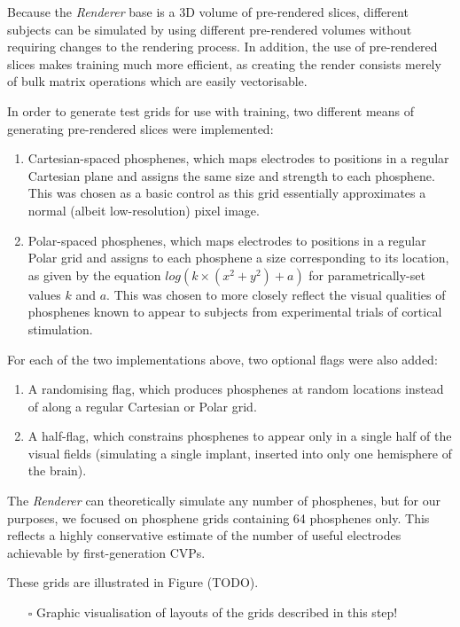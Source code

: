 \documentclass[a4paper,11pt,openany]{book}
\begin{document}
Because the \emph{Renderer} base is a 3D volume of pre-rendered slices, different subjects can be simulated by using different pre-rendered volumes without requiring changes to the rendering process.
In addition, the use of pre-rendered slices makes training much more efficient, as creating the render consists merely of bulk matrix operations which are easily vectorisable.

In order to generate test grids for use with training, two different means of generating pre-rendered slices were implemented:
\begin{enumerate}
\item Cartesian-spaced phosphenes, which maps electrodes to positions in a regular Cartesian plane and assigns the same size and strength to each phosphene.
This was chosen as a basic control as this grid essentially approximates a normal (albeit low-resolution) pixel image.
\item Polar-spaced phosphenes, which maps electrodes to positions in a regular Polar grid and assigns to each phosphene a size corresponding to its location, as given by the equation \(log(k \times (x^2 + y^2) + a)\) for parametrically-set values \(k\) and \(a\).
This was chosen to more closely reflect the visual qualities of phosphenes known to appear to subjects from experimental trials of cortical stimulation.
\end{enumerate}

For each of the two implementations above, two optional flags were also added:
\begin{enumerate}
\item A randomising flag, which produces phosphenes at random locations instead of along a regular Cartesian or Polar grid.
\item A half-flag, which constrains phosphenes to appear only in a single half of the visual fields (simulating a single implant, inserted into only one hemisphere of the brain).
\end{enumerate}

The \emph{Renderer} can theoretically simulate any number of phosphenes, but for our purposes, we focused on phosphene grids containing 64 phosphenes only.
This reflects a highly conservative estimate of the number of useful electrodes achievable by first-generation CVPs.


These grids are illustrated in Figure (TODO).
\begin{itemize}
\item[{$\square$}] Graphic visualisation of layouts of the grids described in this step!
\end{itemize}
\end{document}
